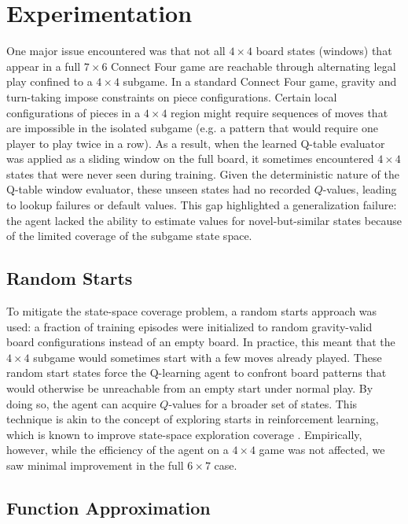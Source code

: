 \documentclass[10pt]{extarticle}
\begin{document}
\section{Experimentation}

One major issue encountered was that not all $4\times4$ board states (windows) that appear in a full $7\times6$ Connect Four game are reachable through alternating legal play confined to a $4\times4$ subgame. In a standard Connect Four game, gravity and turn-taking impose constraints on piece configurations. Certain local configurations of pieces in a $4\times4$ region might require sequences of moves that are impossible in the isolated subgame (e.g. a pattern that would require one player to play twice in a row). As a result, when the learned Q-table evaluator was applied as a sliding window on the full board, it sometimes encountered $4\times4$ states that were never seen during training. Given the deterministic nature of the Q-table window evaluator, these unseen states had no recorded $Q$-values, leading to lookup failures or default values. This gap highlighted a generalization failure: the agent lacked the ability to estimate values for novel-but-similar states because of the limited coverage of the subgame state space.

\subsection{Random Starts}

To mitigate the state-space coverage problem, a random starts approach was used: a fraction of training episodes were initialized to random gravity-valid board configurations instead of an empty board. In practice, this meant that the $4\times4$ subgame would sometimes start with a few moves already played. These random start states force the Q-learning agent to confront board patterns that would otherwise be unreachable from an empty start under normal play. By doing so, the agent can acquire $Q$-values for a broader set of states. This technique is akin to the concept of exploring starts in reinforcement learning, which is known to improve state-space exploration coverage \cite{Sutton2018}. Empirically, however, while the efficiency of the agent on a $4 \times 4$ game was not affected, we saw minimal improvement in the full $6 \times 7$ case.

\subsection{Function Approximation}
\end{document}
